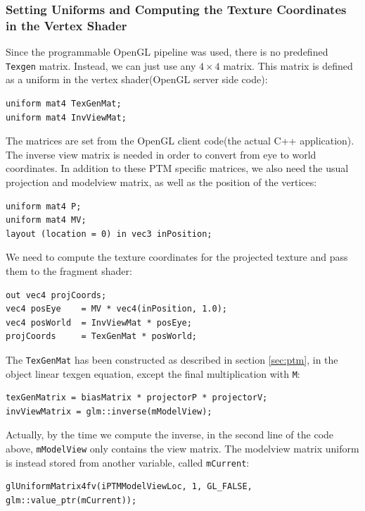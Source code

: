\documentclass[]{article}
\begin{document}
\subsubsection{Setting Uniforms and Computing the Texture Coordinates in the Vertex Shader}

Since the programmable OpenGL pipeline was used, there is no predefined \verb|Texgen| matrix. Instead, we can just use any $4 \times 4$ matrix. This matrix is defined as a uniform in the vertex shader(OpenGL server side code):
\begin{verbatim}
uniform mat4 TexGenMat;
uniform mat4 InvViewMat;
\end{verbatim}

The matrices are set from the OpenGL client code(the actual C++ application). The inverse view matrix is needed in order to convert from eye to world coordinates. In addition to these PTM specific matrices, we also need the usual projection and modelview matrix, as well as the position of the vertices:
\begin{verbatim}
uniform mat4 P;
uniform mat4 MV;
layout (location = 0) in vec3 inPosition;
\end{verbatim}

We need to compute the texture coordinates for the projected texture and pass them to the fragment shader:
\begin{verbatim}
out vec4 projCoords;
vec4 posEye    = MV * vec4(inPosition, 1.0);
vec4 posWorld  = InvViewMat * posEye;
projCoords     = TexGenMat * posWorld;
\end{verbatim}

The \verb|TexGenMat| has been constructed as described in section \ref{sec:ptm}, in the object linear texgen equation, except the final multiplication with \verb|M|:
\begin{verbatim}
texGenMatrix = biasMatrix * projectorP * projectorV;
invViewMatrix = glm::inverse(mModelView);
\end{verbatim} 

Actually, by the time we compute the inverse, in the second line of the code above, \verb|mModelView| only contains the view matrix. The modelview matrix uniform is instead stored from another variable, called \verb|mCurrent|:
\begin{verbatim}
glUniformMatrix4fv(iPTMModelViewLoc, 1, GL_FALSE, 
glm::value_ptr(mCurrent));
\end{verbatim}
\end{document}
